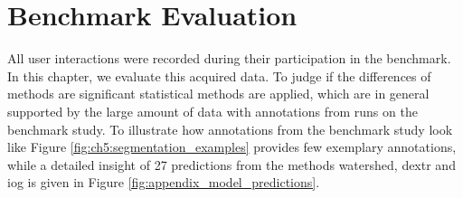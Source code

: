 
\chapter{Benchmark Evaluation}\label{ord:ch5}

All user interactions were recorded during their participation in the benchmark. 
In this chapter, we evaluate this acquired data.
To judge if the differences of methods are significant statistical methods are applied, which are in general supported by the large amount of data with \getNumberBenchmarkAnnotations annotations from \getNumberBenchmarkRuns runs on the benchmark study.
To illustrate how annotations from the benchmark study look like Figure \ref{fig:ch5:segmentation_examples} provides few exemplary annotations, while a detailed insight of 27 predictions from the methods watershed, \gls{dextr} and \gls{iog} is given in Figure \ref{fig:appendix_model_predictions}.


